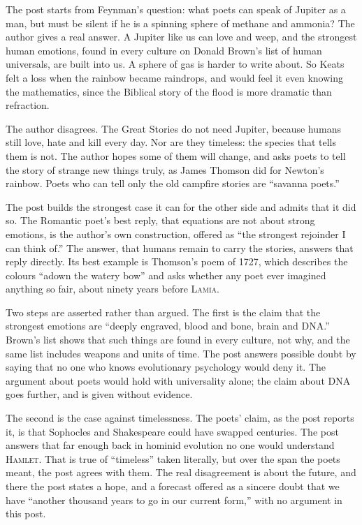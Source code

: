 \begin{afterword}
\summaryhead

The post starts from Feynman's question: what poets can speak of Jupiter as a man, but must be silent if he is a spinning sphere of methane and ammonia? The author gives a real answer. A Jupiter like us can love and weep, and the strongest human emotions, found in every culture on Donald Brown's list of human universals, are built into us. A sphere of gas is harder to write about. So Keats felt a loss when the rainbow became raindrops, and would feel it even knowing the mathematics, since the Biblical story of the flood is more dramatic than refraction.

The author disagrees. The Great Stories do not need Jupiter, because humans still love, hate and kill every day. Nor are they timeless: the species that tells them is not. The author hopes some of them will change, and asks poets to tell the story of strange new things truly, as James Thomson did for Newton's rainbow. Poets who can tell only the old campfire stories are ``savanna poets.''

\responsehead

The post builds the strongest case it can for the other side and admits that it did so. The Romantic poet's best reply, that equations are not about strong emotions, is the author's own construction, offered as ``the strongest rejoinder I can think of.'' The answer, that humans remain to carry the stories, answers that reply directly. Its best example is Thomson's poem of 1727, which describes the colours ``adown the watery bow'' and asks whether any poet ever imagined anything so fair, about ninety years before \textsc{Lamia}.

Two steps are asserted rather than argued. The first is the claim that the strongest emotions are ``deeply engraved, blood and bone, brain and DNA.'' Brown's list shows that such things are found in every culture, not why, and the same list includes weapons and units of time. The post answers possible doubt by saying that no one who knows evolutionary psychology would deny it. The argument about poets would hold with universality alone; the claim about DNA goes further, and is given without evidence.

The second is the case against timelessness. The poets' claim, as the post reports it, is that Sophocles and Shakespeare could have swapped centuries. The post answers that far enough back in hominid evolution no one would understand \textsc{Hamlet}. That is true of ``timeless'' taken literally, but over the span the poets meant, the post agrees with them. The real disagreement is about the future, and there the post states a hope, and a forecast offered as a sincere doubt that we have ``another thousand years to go in our current form,'' with no argument in this post.


\end{afterword}
